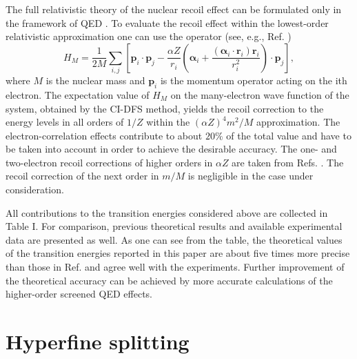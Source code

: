\documentclass[preprint,aps,pra,showpacs,floatfix]{revtex4}
\newcommand{\az}{\alpha Z}
\newcommand{\albi}{\boldsymbol{\alpha}_i}
\begin{document}
The full relativistic theory of the nuclear recoil effect can be formulated only
in the framework of QED \cite{shabaev:PRA:98}. To evaluate the recoil effect
within the lowest-order relativistic approximation one can use the operator
(see, e.g., Ref. \cite{shabaev:PRA:98})
%
\begin{equation}\label{recoil}
  H_M = \frac{1}{2M} \sum_{i,j} \left[ \boldsymbol{p}_i\cdot\boldsymbol{p}_j
    - \frac{\az}{r_i} \left( \albi+\frac{(\albi\cdot\boldsymbol{r}_i)\boldsymbol{r}_i}
    {r^{2}_{i}} \right) \cdot\boldsymbol{p}_j \right],
\end{equation}
%
where $M$ is the nuclear mass and $\boldsymbol{p}_i$ is the momentum operator
acting on the ith electron. The expectation value of $H_M$ on the many-electron
wave function of the system, obtained by the CI-DFS method, yields the recoil
correction to the energy levels in all orders of $1/Z$ within the $(\az)^4{m^2}/{M}$
approximation. The electron-correlation effects contribute to about $20\%$
of the total value and have to be taken into account in order to achieve
the desirable accuracy. The one- and two-electron recoil corrections of higher
orders in $\az$ are taken from Refs. \cite{artemyev:PRA:95, JPB28_5201}.
The recoil correction of the next order in $m/M$ is negligible in the case
under consideration.

All contributions to the transition energies considered above are collected
in Table I. For comparison, previous theoretical results and available
experimental data are presented as well. As one can see from the table,
the theoretical values of the transition energies reported in this paper
are about five times more precise than those in Ref. \cite{kieslich:PRA:04}
and agree well with the experiments. Further improvement of the theoretical
accuracy can be achieved by more accurate calculations of the higher-order
screened QED effects.
%
%
\section{Hyperfine splitting}
\label{section:hfs}
\end{document}
